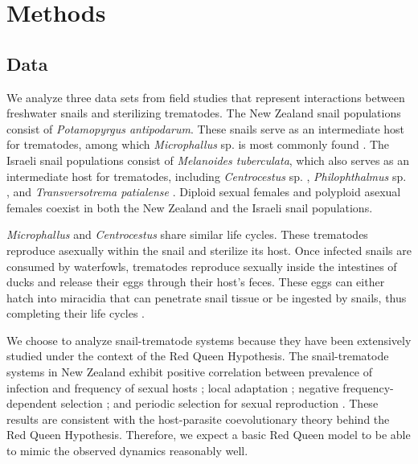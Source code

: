 \documentclass{article}\usepackage[]{graphicx}\usepackage[]{color}
\begin{document}
\section{Methods}

\subsection{Data}

We analyze three data sets from field studies \citep{vergara2014infection, mckone2016fine, dagan2013clonal} that represent interactions between freshwater snails and sterilizing trematodes.
The New Zealand snail populations \citep{vergara2014infection, mckone2016fine} consist of \textit{Potamopyrgus antipodarum}. These snails serve as an intermediate host for trematodes, 
among which \textit{Microphallus} sp. is most commonly found \citep{winterbourn1974larval, lively1987evidence}.
The Israeli snail populations \citep{dagan2013clonal} consist of \textit{Melanoides tuberculata}, which also serves as an intermediate host for trematodes, including \textit{Centrocestus} sp. \citep{ben2005spatial}, \textit{Philophthalmus} sp. \citep{ben2006first}, and \textit{Transversotrema patialense} \citep{ben2005differential}.
Diploid sexual females and polyploid asexual females coexist in both the New Zealand \citep{phillips1989genetics, wallace1992parthenogenesis, dybdahl1995diverse} and the Israeli \citep{samadi1999microsatellite} snail populations.

\textit{Microphallus} and \textit{Centrocestus} share similar life cycles. 
These trematodes reproduce asexually within the snail and sterilize its host.
Once infected snails are consumed by waterfowls, trematodes reproduce sexually
inside the intestines of ducks and release their eggs through their host's 
feces.
These eggs can either hatch into miracidia that can penetrate snail tissue or
be ingested by snails, thus completing their life cycles \citep{lively1991experimental, ben2005spatial}. 

We choose to analyze snail-trematode systems because they have been extensively studied under the context of the Red Queen Hypothesis.
The snail-trematode systems in New Zealand exhibit positive correlation between prevalence of infection and frequency of sexual hosts \citep{lively2002temporal, king2011parasites, vergara2013geographic, mckone2016fine, gibson2016within}; local adaptation \citep{lively1989adaptation, lively2004host, king2011coevolutionary}; negative frequency-dependent selection \citep{dybdahl1995host, dybdahl1998host,jokela2009maintenance, koskella2009evidence}; and periodic selection for sexual reproduction \citep{vergara2014infection, gibson2018periodic}. 
These results are consistent with the host-parasite coevolutionary theory behind the Red Queen Hypothesis.
Therefore, we expect a basic Red Queen model to be able to mimic the observed dynamics reasonably well.
\end{document}

